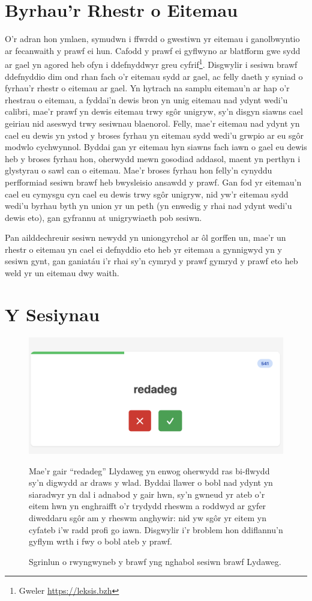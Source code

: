 \section{Byrhau'r Rhestr o Eitemau}
O'r adran hon ymlaen, symudwn i ffwrdd o gwestiwn yr eitemau i ganolbwyntio ar fecanwaith y prawf ei hun. Cafodd y prawf ei gyflwyno ar blatfform gwe sydd ar gael yn agored heb ofyn i ddefnyddwyr greu cyfrif\footnote{Gweler \href{https://leksis.bzh}{https://leksis.bzh}}. Disgwylir i sesiwn brawf ddefnyddio dim ond rhan fach o'r eitemau sydd ar gael, ac felly daeth y syniad o fyrhau'r rhestr o eitemau ar gael. Yn hytrach na samplu eitemau'n ar hap o'r rhestrau o eitemau, a fyddai'n dewis bron yn unig eitemau nad ydynt wedi'u calibri, mae'r prawf yn dewis eitemau trwy sgôr unigryw, sy'n disgyn siawns cael geiriau nid aseswyd trwy sesiwnau blaenorol. Felly, mae'r eitemau nad ydynt yn cael eu dewis yn ystod y broses fyrhau yn eitemau sydd wedi'u grwpio ar eu sgôr modwlo cychwynnol. Byddai gan yr eitemau hyn siawns fach iawn o gael eu dewis heb y broses fyrhau hon, oherwydd mewn gosodiad addasol, maent yn perthyn i glystyrau o sawl can o eitemau. Mae'r broses fyrhau hon felly'n cynyddu perfformiad sesiwn brawf heb bwysleisio ansawdd y prawf. Gan fod yr eitemau'n cael eu cymysgu cyn cael eu dewis trwy sgôr unigryw, nid yw'r eitemau sydd wedi'u byrhau byth yn union yr un peth (yn enwedig y rhai nad ydynt wedi'u dewis eto), gan gyfrannu at unigrywiaeth pob sesiwn. 

Pan ailddechreuir sesiwn newydd yn uniongyrchol ar ôl gorffen un, mae'r un rhestr o eitemau yn cael ei defnyddio eto heb yr eitemau a gynnigwyd yn y sesiwn gynt, gan ganiatáu i'r rhai sy'n cymryd y prawf gymryd y prawf eto heb weld yr un eitemau dwy waith.

\section{Y Sesiynau}
\begin{figure}
    \centering
    \includegraphics[width=0.5\linewidth]{figures/screenshot-redadeg.png}
    \caption{Sgrinlun o rwyngwyneb y brawf yng nghabol sesiwn brawf Lydaweg.}
    \medskip
    \small
    Mae'r gair ``redadeg'' Llydaweg yn enwog oherwydd ras bi-flwydd sy'n digwydd ar draws y wlad. Byddai llawer o bobl nad ydynt yn siaradwyr yn dal i adnabod y gair hwn, sy'n gwneud yr ateb o'r eitem hwn yn enghraifft o'r trydydd rheswm a roddwyd ar gyfer diweddaru sgôr am y rheswm anghywir: nid yw sgôr yr eitem yn cyfateb i'w radd profi go iawn. Disgwylir i'r broblem hon ddiflannu'n gyflym wrth i fwy o bobl ateb y prawf.
\end{figure}\label{fig:screenshot}

